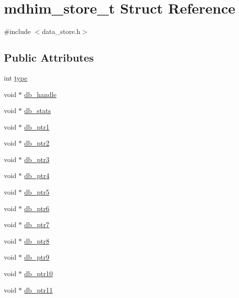 \hypertarget{structmdhim__store__t}{\section{mdhim\-\_\-store\-\_\-t Struct Reference}
\label{structmdhim__store__t}
}


{\ttfamily \#include $<$data\-\_\-store.\-h$>$}

\subsection*{Public Attributes}
\begin{DoxyCompactItemize}
\item 
int \hyperlink{structmdhim__store__t_a00f8694bd01cc8cfda7479b7384e083b}{type}
\item 
void $\ast$ \hyperlink{structmdhim__store__t_ab9c004b5de88a17f058146ef0a91e696}{db\-\_\-handle}
\item 
void $\ast$ \hyperlink{structmdhim__store__t_a6313bc8d5b21fa995c067f256fff1f83}{db\-\_\-stats}
\item 
void $\ast$ \hyperlink{structmdhim__store__t_a88c99ce5295e88a8afaac3041bd73fbe}{db\-\_\-ptr1}
\item 
void $\ast$ \hyperlink{structmdhim__store__t_a026cd325c0842df093a5d097c975d06a}{db\-\_\-ptr2}
\item 
void $\ast$ \hyperlink{structmdhim__store__t_ab0ef24f26ceaefd6d7149b939afec79c}{db\-\_\-ptr3}
\item 
void $\ast$ \hyperlink{structmdhim__store__t_a7c7bb30bc1e9a4474f36461a45add7dc}{db\-\_\-ptr4}
\item 
void $\ast$ \hyperlink{structmdhim__store__t_a16ef23e16acf5805e5aedbc083d58d21}{db\-\_\-ptr5}
\item 
void $\ast$ \hyperlink{structmdhim__store__t_a8735e088b5c11a1da361d809d827342c}{db\-\_\-ptr6}
\item 
void $\ast$ \hyperlink{structmdhim__store__t_ae0fb1705ae0666ee085aa08a050601b2}{db\-\_\-ptr7}
\item 
void $\ast$ \hyperlink{structmdhim__store__t_a985c64544d540911fa449727037894a6}{db\-\_\-ptr8}
\item 
void $\ast$ \hyperlink{structmdhim__store__t_a2c02c5ae650bd0315ff844bdfbf9846b}{db\-\_\-ptr9}
\item 
void $\ast$ \hyperlink{structmdhim__store__t_a01c12aa1c69a352aecd5c6732880b52b}{db\-\_\-ptr10}
\item 
void $\ast$ \hyperlink{structmdhim__store__t_acd81da642998a348ac407f50524d4032}{db\-\_\-ptr11}

\end{DoxyCompactItemize}

